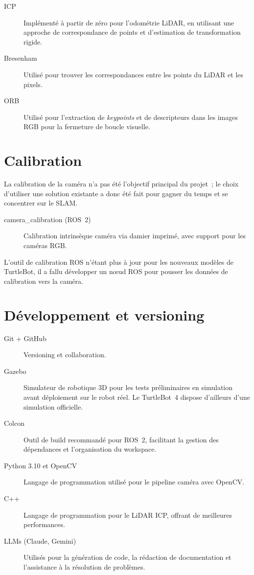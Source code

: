 \documentclass[12pt,a4paper]{report}
\begin{document}
\begin{description}
  \item[ICP] Implémenté à partir de zéro pour l'odométrie LiDAR, en utilisant une
        approche de correspondance de points et d'estimation de transformation rigide.
  \item[Bresenham] Utilisé pour trouver les correspondances entre les points du LiDAR
        et les pixels.
  \item[ORB] Utilisé pour l'extraction de \emph{keypoints} et de descripteurs dans les
        images RGB pour la fermeture de boucle visuelle.
\end{description}

\section{Calibration}
La calibration de la caméra n'a pas été l'objectif principal du projet~; le
choix d'utiliser une solution existante a donc été fait pour gagner du temps et
se concentrer sur le SLAM.\@

\begin{description}
  \item[camera\_calibration (ROS~2)] Calibration intrinsèque caméra via damier imprimé,
        avec support pour les caméras RGB.\@
\end{description}

L'outil de calibration ROS n'étant plus à jour pour les nouveaux modèles de
TurtleBot, il a fallu développer un nœud ROS pour pousser les données de
calibration vers la caméra.\@

\section{Développement et versioning}

\begin{description}
  \item[Git + GitHub] Versioning et collaboration.
  \item[Gazebo] Simulateur de robotique 3D pour les tests préliminaires en simulation
        avant déploiement sur le robot réel. Le TurtleBot~4 dispose d'ailleurs d'une
        simulation officielle.
  \item[Colcon] Outil de build recommandé pour ROS~2, facilitant la gestion des
        dépendances et l'organisation du workspace.
  \item[Python 3.10 et OpenCV] Langage de programmation utilisé pour le pipeline caméra
        avec OpenCV.\@
  \item[C++] Langage de programmation pour le LiDAR ICP, offrant de meilleures
        performances.
  \item[LLMs (Claude, Gemini)] Utilisés pour la génération de code, la rédaction de
        documentation et l'assistance à la résolution de problèmes.
\end{description}
\end{document}
